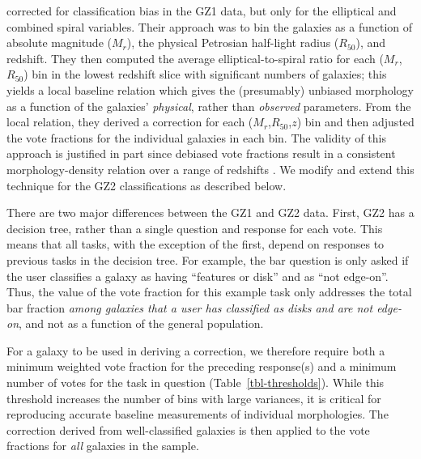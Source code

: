 \documentclass[useAMS,usenatbib]{mn2e}
\newcommand{\mr}{$M_r$}
\newcommand{\rfifty}{$R_{50}$}
\begin{document}
\citet{bam09} corrected for classification bias in the GZ1 data, but only for the elliptical and combined spiral variables. Their approach was to bin the galaxies as a function of absolute magnitude (\mr), the physical Petrosian half-light radius (\rfifty), and redshift. They then computed the average elliptical-to-spiral ratio for each (\mr,\rfifty) bin in the lowest redshift slice with significant numbers of galaxies; this yields a local baseline relation which gives the (presumably) unbiased morphology as a function of the galaxies' {\em physical}, rather than {\em observed} parameters. From the local relation, they derived a correction for each (\mr,\rfifty,$z$) bin and then adjusted the vote fractions for the individual galaxies in each bin. The validity of this approach is justified in part since debiased vote fractions result in a consistent morphology-density relation over a range of redshifts \citep{bam09}. We modify and extend this technique for the GZ2 classifications as described below. 

There are two major differences between the GZ1 and GZ2 data. First, GZ2 has a decision tree, rather than a single question and response for each vote. This means that all tasks, with the exception of the first, depend on responses to previous tasks in the decision tree. For example, the bar question is only asked if the user classifies a galaxy as having ``features or disk'' and as ``not edge-on''. Thus, the value of the vote fraction for this example task only addresses the total bar fraction {\em among galaxies that a user has classified as disks and are not edge-on}, and not as a function of the general population. 

For a galaxy to be used in deriving a correction, we therefore require both a minimum weighted vote fraction for the preceding response(s) and a minimum number of votes for the task in question (Table~\ref{tbl-thresholds}). While this threshold increases the number of bins with large variances, it is critical for reproducing accurate baseline measurements of individual morphologies. The correction derived from well-classified galaxies is then applied to the vote fractions for {\em all} galaxies in the sample. 
\end{document}
